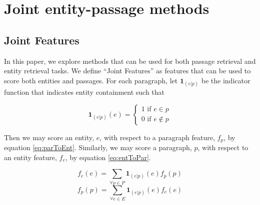\documentclass{article}
\begin{document}
\section{Joint entity-passage methods}

\subsection{Joint Features}\label{sec:joint}
In this paper, we explore methods that can be used for both passage retrieval and entity retrieval tasks.
We define ``Joint Features'' as features that can be used to score both entities and passages.
For each paragraph, let $\mathbf{1}_{(e|p)}$ be the indicator function that indicates entity containment such that

$$
\mathbf{1}_{(e|p)}(e) = \begin{cases}
    1  \text{ if } e \in p \\
    0 \text{ if } e \not\in p
\end{cases}
$$

Then we may score an entity, $e$, with respect to a paragraph feature, $f_p$, by equation \ref{eq:parToEnt}.
Similarly, we may score a paragraph, $p$, with respect to an entity feature, $f_e$, by equation \ref{eq:entToPar}.


\begin{multicols}{2}
  \begin{equation}\label{eq:parToEnt}
    f_e(e) = \sum_{\forall p \in P}{\mathbf{1}_{(e|p)}(e)f_p(p)}
  \end{equation}\break
  \begin{equation}\label{eq:entToPar}
    f_p(p) = \sum_{\forall e \in E}{\mathbf{1}_{(e|p)}(e)f_e(e)}
  \end{equation}
\end{multicols}

\end{document}
